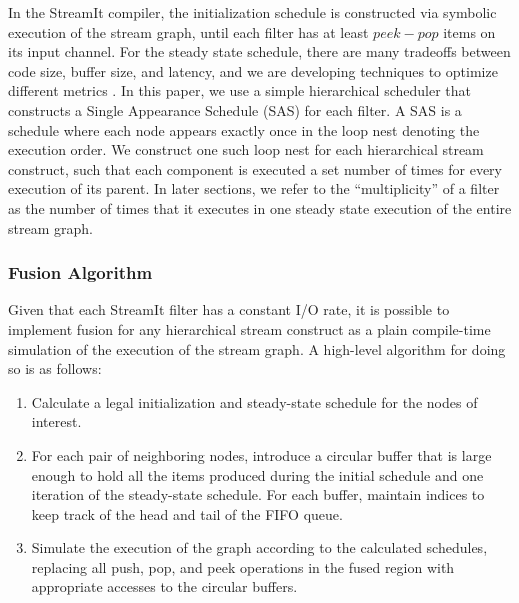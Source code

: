 In the StreamIt compiler, the initialization schedule is constructed
via symbolic execution of the stream graph, until each filter has at
least $peek-pop$ items on its input channel.  For the steady state
schedule, there are many tradeoffs between code size, buffer size, and
latency, and we are developing techniques to optimize different
metrics \cite{streamittech2}.  In this paper, we use a simple
hierarchical scheduler that constructs a Single Appearance Schedule
(SAS) \cite{leesdf} for each filter.  A SAS is a schedule where each
node appears exactly once in the loop nest denoting the execution
order.  We construct one such loop nest for each hierarchical stream
construct, such that each component is executed a set number of times
for every execution of its parent.  In later sections, we refer to the
``multiplicity'' of a filter as the number of times that it executes
in one steady state execution of the entire stream graph.

\subsubsection{Fusion Algorithm}

Given that each StreamIt filter has a constant I/O rate, it is
possible to implement fusion for any hierarchical stream construct as
a plain compile-time simulation of the execution of the stream graph.
A high-level algorithm for doing so is as follows:
\begin{enumerate}
\item Calculate a legal initialization and steady-state schedule for
the nodes of interest.

\item For each pair of neighboring nodes, introduce a circular buffer
that is large enough to hold all the items produced during the initial
schedule and one iteration of the steady-state schedule.  For each
buffer, maintain indices to keep track of the head and tail of the
FIFO queue.

\item Simulate the execution of the graph according to the calculated
schedules, replacing all push, pop, and peek operations in the fused
region with appropriate accesses to the circular buffers.
\end{enumerate}

